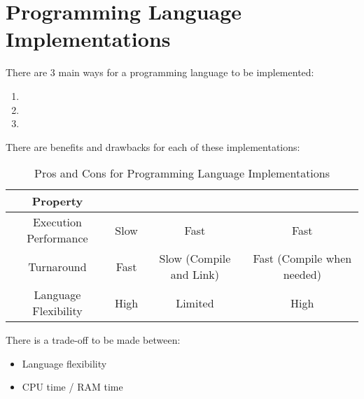\section{Programming Language Implementations}\label{sec:Lang_Implementations}
There are 3 main ways for a programming language to be implemented:
\begin{enumerate}[noitemsep]
\item {}
\item {}
\item {}
\end{enumerate}

There are benefits and drawbacks for each of these implementations:
\begin{table}[h!]
  \centering
  \begin{tabular}{cccc}
    \toprule
    Property & \nameref{subsec:Interpretation} & \nameref{subsec:Compilation} & \nameref{subsec:Hybrid_Implementation} \\
    \midrule
    Execution Performance & Slow & Fast & Fast \\
    Turnaround & Fast & Slow (Compile and Link) & Fast (Compile when needed) \\
    Language Flexibility & High & Limited & High \\
    \bottomrule
  \end{tabular}
  \caption{Pros and Cons for Programming Language Implementations}
  \label{tab:Lang_Implementations_Pros_Cons}
\end{table}

There is a trade-off to be made between:
\begin{itemize}[noitemsep]
\item Language flexibility
\item CPU time / RAM time
\end{itemize}

